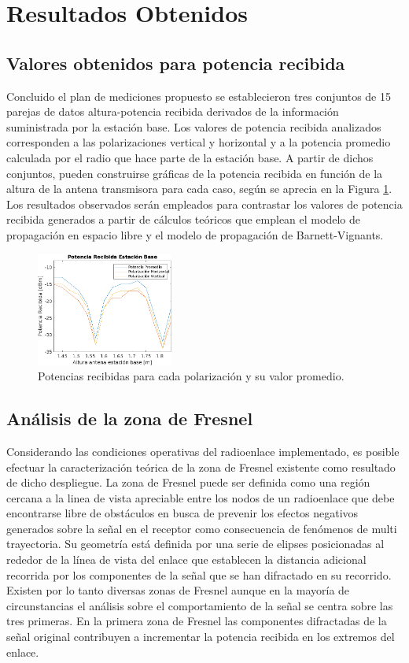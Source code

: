 \documentclass[conference]{IEEEtran}
\begin{document}
\section{Resultados Obtenidos}
\subsection{Valores obtenidos para potencia recibida}
Concluido el plan de mediciones propuesto se establecieron tres conjuntos de 15 parejas de datos altura-potencia recibida derivados de la información suministrada
por la estación base. Los valores de potencia recibida analizados corresponden a las polarizaciones vertical y horizontal y a la potencia
promedio calculada por el radio que hace parte de la estación base. A partir de dichos conjuntos, pueden construirse gráficas de la potencia recibida en función de la 
altura de la antena transmisora para cada caso, según se aprecia en la Figura \ref{fig:Potencias}. Los resultados observados serán empleados para contrastar los valores de potencia 
recibida generados a partir de cálculos teóricos que emplean el modelo de propagación en espacio libre y el modelo de propagación de Barnett-Vignants.
\begin{figure}
    \centering
          \includegraphics[width=0.4\textwidth]{Potencias.png}
        \caption{Potencias recibidas para cada polarización y su valor promedio.
        }
        \label{fig:Potencias}
\end{figure}
\subsection{Análisis de la zona de Fresnel}
Considerando las condiciones operativas del radioenlace implementado, es posible efectuar la caracterización teórica de la 
zona de Fresnel existente como resultado de dicho despliegue. La zona de Fresnel puede ser definida como una región cercana a la 
linea de vista apreciable entre los nodos de un radioenlace que debe encontrarse libre de obstáculos en busca de prevenir los efectos negativos
generados sobre la señal en el receptor como consecuencia de fenómenos de multi trayectoria. Su geometría está definida por una serie de elipses 
posicionadas al rededor de la línea de vista del enlace que establecen la distancia adicional recorrida por los componentes de la señal
que se han difractado en su recorrido. Existen por lo tanto diversas zonas de Fresnel aunque en la mayoría de circunstancias el análisis 
sobre el comportamiento de la señal se centra sobre las tres primeras.  En la primera zona de Fresnel las componentes difractadas de la señal
original contribuyen a incrementar la potencia recibida en los extremos del enlace. 
\end{document}
